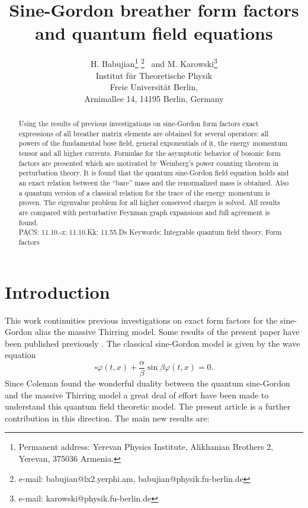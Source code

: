 \documentclass[a4paper,a4paper]{article}
\begin{document}
\title{Sine-Gordon breather form factors\\
and quantum field equations}
\author{H. Babujian\thanks{%
Permanent address: Yerevan Physics Institute, Alikhanian Brothers 2,
Yerevan, 375036 Armenia.} \thanks{
e-mail: babujian@lx2.yerphi.am, babujian@physik.fu-berlin.de}~ and M.
Karowski\thanks{
e-mail: karowski@physik.fu-berlin.de} \\
Institut f\"ur Theoretische Physik\\
Freie Universit\"at Berlin,\\
Arnimallee 14, 14195 Berlin, Germany\\
}
\maketitle

\begin{abstract}
Using the results of previous investigations on sine-Gordon form factors
exact expressions of all breather matrix elements are obtained for several
operators: all powers of the fundamental bose field, general exponentials of
it, the energy momentum tensor and all higher currents. Formulae for the
asymptotic behavior of bosonic form factors are presented which are
motivated by Weinberg's power counting theorem in perturbation theory. It is
found that the quantum sine-Gordon field equation holds and an exact
relation between the ``bare'' mass and the renormalized mass is obtained.
Also a quantum version of a classical relation for the trace of the energy
momentum is proven. The eigenvalue problem for all higher conserved charges
is solved. All results are compared with perturbative Feynman graph
expansions and full agreement is found.\\[8pt]
PACS: 11.10.-z; 11.10.Kk; 11.55.Ds\newline
Keywords: Integrable quantum field theory, Form factors
\end{abstract}


\section{Introduction}

This work continuities previous investigations \cite{BFKZ,BK} on exact form
factors for the sine-Gordon alias the massive Thirring model. Some results
of the present paper have been published previously \cite{BK1}. The
classical sine-Gordon model is given by the wave equation 
\[
\square \varphi (t,x)+\frac{\alpha }{\beta }\sin \beta \varphi (t,x)=0. 
\]
Since Coleman \cite{Co} found the wonderful duality between the quantum
sine-Gordon and the massive Thirring model a great deal of effort have been
made to understand this quantum field theoretic model. The present article
is a further contribution in this direction. The main new results are:
\end{document}
